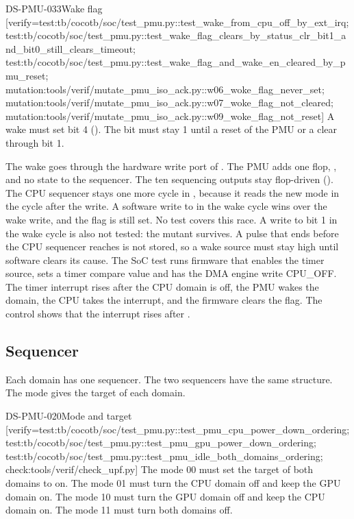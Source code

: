 \begin{requirement}{DS-PMU-033}{Wake flag}
[verify={test:tb/cocotb/soc/test_pmu.py::test_wake_from_cpu_off_by_ext_irq; test:tb/cocotb/soc/test_pmu.py::test_wake_flag_clears_by_status_clr_bit1_and_bit0_still_clears_timeout; test:tb/cocotb/soc/test_pmu.py::test_wake_flag_and_wake_en_cleared_by_pmu_reset; mutation:tools/verif/mutate_pmu_iso_ack.py::w06_woke_flag_never_set; mutation:tools/verif/mutate_pmu_iso_ack.py::w07_woke_flag_not_cleared; mutation:tools/verif/mutate_pmu_iso_ack.py::w09_woke_flag_not_reset}]
A wake must set  bit 4 (). The bit must stay 1 until a reset of the PMU or a clear through  bit 1.
\end{requirement}
\begin{information}
The wake goes through the hardware write port of . The PMU adds one flop, , and no state to the sequencer. The ten sequencing outputs stay flop-driven (). The CPU sequencer stays one more cycle in , because it reads the new mode in the cycle after the write. A software write to  in the wake cycle wins over the wake write, and the flag is still set. No test covers this race. A write to  bit 1 in the wake cycle is also not tested: the mutant  survives. A pulse that ends before the CPU sequencer reaches  is not stored, so a wake source must stay high until software clears its cause. The SoC test  runs firmware that enables the timer source, sets a timer compare value and has the DMA engine write CPU\_OFF. The timer interrupt rises after the CPU domain is off, the PMU wakes the domain, the CPU takes the interrupt, and the firmware clears the flag. The control  shows that the interrupt rises after .
\end{information}

\subsection{Sequencer}\label{ds:mod:pmu:sequencer}
Each domain has one sequencer. The two sequencers have the same structure. The mode gives the target of each domain.

\begin{requirement}{DS-PMU-020}{Mode and target}
[verify={test:tb/cocotb/soc/test_pmu.py::test_pmu_cpu_power_down_ordering; test:tb/cocotb/soc/test_pmu.py::test_pmu_gpu_power_down_ordering; test:tb/cocotb/soc/test_pmu.py::test_pmu_idle_both_domains_ordering; check:tools/verif/check_upf.py}]
The mode 00 must set the target of both domains to on. The mode 01 must turn the CPU domain off and keep the GPU domain on. The mode 10 must turn the GPU domain off and keep the CPU domain on. The mode 11 must turn both domains off.
\end{requirement}

